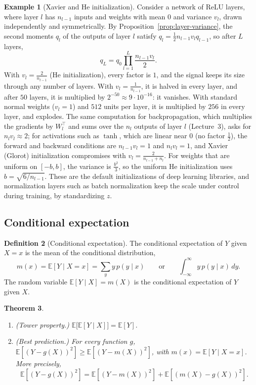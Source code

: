 \documentclass[11pt]{article}
\newcommand{\E}{\mathbb{E}}
\theoremstyle{definition}
\newtheorem{definition}{Definition}[section]
\newtheorem{example}[definition]{Example}
\theoremstyle{plain}
\newtheorem{theorem}[definition]{Theorem}
\theoremstyle{remark}
\begin{document}
\begin{example}[Xavier and He initialization]\label{ex:initialization}
    Consider a network of ReLU layers, where layer $l$ has $n_{l-1}$ inputs and weights with mean $0$ and variance $v_l$, drawn independently and symmetrically. By Proposition~\ref{prop:layer-variance}, the second moments $q_l$ of the outputs of layer $l$ satisfy $q_l = \frac{1}{2}n_{l-1}v_lq_{l-1}$, so after $L$ layers,
    \[q_L = q_0\prod_{l=1}^L \frac{n_{l-1}v_l}{2}.\]
    With $v_l = \frac{2}{n_{l-1}}$ (He initialization), every factor is $1$, and the signal keeps its size through any number of layers. With $v_l = \frac{1}{n_{l-1}}$, it is halved in every layer, and after $50$ layers, it is multiplied by $2^{-50} \approx 9 \cdot 10^{-16}$: it vanishes. With standard normal weights ($v_l = 1$) and $512$ units per layer, it is multiplied by $256$ in every layer, and explodes. The same computation for backpropagation, which multiplies the gradients by $W_l^\top$ and sums over the $n_l$ outputs of layer $l$ (Lecture~3), asks for $n_lv_l \approx 2$; for activations such as $\tanh$, which are linear near $0$ (no factor $\frac{1}{2}$), the forward and backward conditions are $n_{l-1}v_l = 1$ and $n_lv_l = 1$, and Xavier (Glorot) initialization compromises with $v_l = \frac{2}{n_{l-1} + n_l}$. For weights that are uniform on $[-b, b]$, the variance is $\frac{b^2}{3}$, so the uniform He initialization uses $b = \sqrt{6/n_{l-1}}$. These are the default initializations of deep learning libraries, and normalization layers such as batch normalization keep the scale under control during training, by standardizing $z$.
\end{example}

\subsection{Conditional expectation}\label{sec:conditional-expectation}

\begin{definition}[Conditional expectation]\label{def:conditional-expectation}
    The conditional expectation of $Y$ given $X = x$ is the mean of the conditional distribution,
    \[m(x) = \E[Y \mid X = x] = \sum_y y\,p(y \mid x) \qquad \text{or} \qquad \int_{-\infty}^\infty y\,p(y \mid x) \, dy.\]
    The random variable $\E[Y \mid X] = m(X)$ is the conditional expectation of $Y$ given $X$.
\end{definition}

\begin{theorem}\label{thm:conditional-expectation}
    \begin{enumerate}
        \item (Tower property.) $\E\big[\E[Y \mid X]\big] = \E[Y]$.
        \item (Best prediction.) For every function $g$, $\E[(Y - g(X))^2] \geq \E[(Y - m(X))^2]$, with $m(x) = \E[Y \mid X = x]$. More precisely,
        \[\E[(Y - g(X))^2] = \E[(Y - m(X))^2] + \E[(m(X) - g(X))^2].\]
    \end{enumerate}
\end{theorem}
\end{document}
